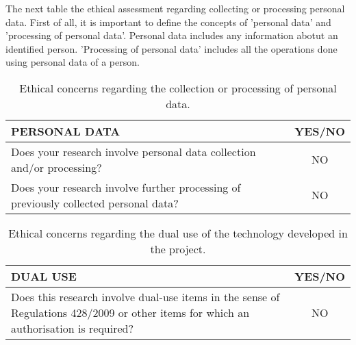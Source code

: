 The next table the ethical assessment regarding collecting or processing personal data. First of all, it is important to define the concepts of 'personal data' and 'processing of personal data'. Personal data includes any information abotut an identified person. 'Processing of personal data' includes all the operations done using personal data of a person.\\

\begin{table}[H]
	\centering
	\begin{tabular}[H]{ p{12.6cm} c }
		
		\toprule[2pt]
		
		\textbf{PERSONAL DATA} & \textbf{YES/NO} \\
		
		\midrule[1.5pt]
		
		Does your research involve personal data collection and/or processing?\vspace{0.2cm} & NO \\
		
		Does your research involve further processing of previously collected personal data?\vspace{0.2cm} & NO \\
		
	    \bottomrule[2pt]
	    	
	\end{tabular}
	\caption[Ethics - Personal data]{Ethical concerns regarding the collection or processing of personal data.}
	\label{Ethics_personaldata}
\end{table}



\begin{table}[H]
	\centering
	\begin{tabular}[H]{ p{12.6cm} c }
		
		\toprule[2pt]
		
		\textbf{DUAL USE} & \textbf{YES/NO} \\
		
		\midrule[1.5pt]
		
		Does this research involve dual-use items in the sense of Regulations 428/2009 or other items for which an authorisation is required?\vspace{0.2cm} & NO\\
		
		\bottomrule[2pt]	
			
	\end{tabular}
	\caption[Ethics - Dual use]{Ethical concerns regarding the dual use of the technology developed in the project.}
	\label{Ethics_Dualuse}
\end{table}



